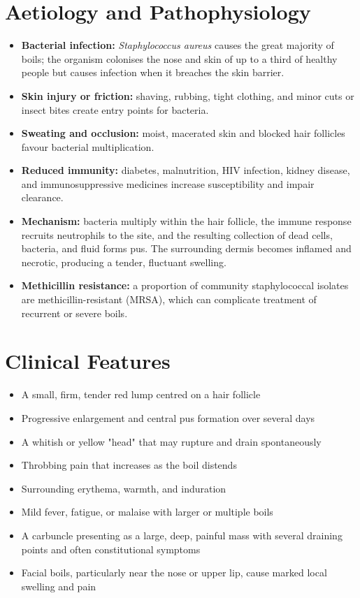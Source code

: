 \section*{Aetiology and Pathophysiology}
\begin{itemize}
    \item \textbf{Bacterial infection:} \textit{Staphylococcus aureus} causes the great majority of boils; the organism colonises the nose and skin of up to a third of healthy people but causes infection when it breaches the skin barrier.
    \item \textbf{Skin injury or friction:} shaving, rubbing, tight clothing, and minor cuts or insect bites create entry points for bacteria.
    \item \textbf{Sweating and occlusion:} moist, macerated skin and blocked hair follicles favour bacterial multiplication.
    \item \textbf{Reduced immunity:} diabetes, malnutrition, HIV infection, kidney disease, and immunosuppressive medicines increase susceptibility and impair clearance.
    \item \textbf{Mechanism:} bacteria multiply within the hair follicle, the immune response recruits neutrophils to the site, and the resulting collection of dead cells, bacteria, and fluid forms pus. The surrounding dermis becomes inflamed and necrotic, producing a tender, fluctuant swelling.
    \item \textbf{Methicillin resistance:} a proportion of community staphylococcal isolates are methicillin-resistant (MRSA), which can complicate treatment of recurrent or severe boils.
\end{itemize}

\section*{Clinical Features}
\begin{itemize}
    \item A small, firm, tender red lump centred on a hair follicle
    \item Progressive enlargement and central pus formation over several days
    \item A whitish or yellow "head" that may rupture and drain spontaneously
    \item Throbbing pain that increases as the boil distends
    \item Surrounding erythema, warmth, and induration
    \item Mild fever, fatigue, or malaise with larger or multiple boils
    \item A carbuncle presenting as a large, deep, painful mass with several draining points and often constitutional symptoms
    \item Facial boils, particularly near the nose or upper lip, cause marked local swelling and pain
\end{itemize}

